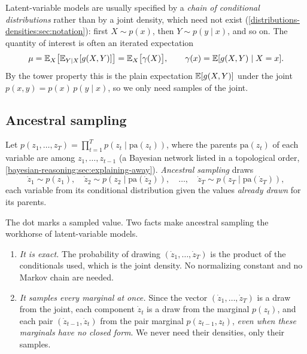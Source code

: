 \begin{notechapter}
Latent-variable models are usually specified by a \emph{chain of conditional
distributions} rather than by a joint density, which need not exist
(\cref{distributions-densities:sec:notation}): first $X\sim p(x)$, then
$Y\sim p(y\mid x)$, and so on. The quantity of interest is often an iterated
expectation
\[
  \mu = \mathbb{E}_X\bigl[\mathbb{E}_{Y\mid X}[g(X,Y)]\bigr] = \mathbb{E}_X\bigl[\gamma(X)\bigr],\qquad
  \gamma(x) = \mathbb{E}[g(X,Y)\mid X = x].
\]
By the tower property this is the plain expectation $\mathbb{E}[g(X,Y)]$ under the joint
$p(x,y) = p(x)\,p(y\mid x)$, so we only need samples of the joint.

\subsection{Ancestral sampling}

\begin{definition}\label{monte-carlo:def:ancestral}
Let $p(z_1,\dots,z_T) = \prod_{t=1}^Tp(z_t\mid\mathrm{pa}(z_t))$, where the parents
$\mathrm{pa}(z_t)$ of each variable are among $z_1,\dots,z_{t-1}$ (a Bayesian network
listed in a topological order, \cref{bayesian-reasoning:sec:explaining-away}).
\emph{Ancestral sampling} draws
\[
  \dot z_1\sim p(z_1),\quad \dot z_2\sim p(z_2\mid\mathrm{pa}(\dot z_2)),\quad\dots,\quad
  \dot z_T\sim p(z_T\mid\mathrm{pa}(\dot z_T)),
\]
each variable from its conditional distribution given the values \emph{already
drawn} for its parents.
\end{definition}

The dot marks a sampled value. Two facts make ancestral sampling the workhorse of
latent-variable models.
\begin{enumerate}[nosep]
  \item \emph{It is exact.} The probability of drawing $(\dot z_1,\dots,\dot z_T)$ is the
        product of the conditionals used, which is the joint density. No
        normalizing constant and no Markov chain are needed.
  \item \emph{It samples every marginal at once.} Since the vector
        $(\dot z_1,\dots,\dot z_T)$ is a draw from the joint, each component $\dot z_t$
        is a draw from the marginal $p(z_t)$, and each pair $(\dot z_{t-1},\dot z_t)$
        from the pair marginal $p(z_{t-1},z_t)$, \emph{even when these marginals have
        no closed form}. We never need their densities, only their samples.
\end{enumerate}


\end{notechapter}
